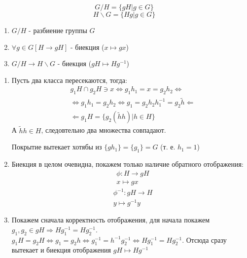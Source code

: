 \begin{Def}
\[
	G / H = \{gH | g \in G\}
\]
\[
	H \backslash G = \{Hg | g \in G\}
\]
\end{Def}

\begin{Th}
\begin{enumerate}
\item $G / H$ - разбиение группы $G$

\item $\forall g \in G \left[H \rightarrow gH\right]$ - биекция ($x \mapsto gx$)

\item $G / H \rightarrow H \backslash G$ - биекция ($gH \mapsto Hg^{-1}$)
\end{enumerate}
\end{Th}

\begin{Proof}
\begin{enumerate}
\item Пусть два класса пересекаются, тогда:
\[
\begin{split}
	& g_1H \cap g_2H \ni x \Leftrightarrow g_1h_1 = x = g_2h_2 \Leftrightarrow \\
	& \Leftrightarrow g_1h_1 = g_2h_2 \Leftrightarrow g_1 = g_2 h_2 h_1^{-1} = g_2 \tilde h \Leftarrow \\
	& \Leftarrow g_1H = \{g_2 \left(\tilde h h\right) | h \in H\} 
\end{split}
\]
А $\tilde h h \in H$, следовтельно два множества совпадают.

Покрытие вытекает хотябы из $\{gh_1\} = \{g_1\} = G$ (т. е. $h_1 = 1$)

\item Биекция в целом очевидна, покажем только наличие обратного отображения:
\[
\begin{split}
	& \phi : H \rightarrow gH \\
	& x \mapsto gx
\end{split}
\]
\[
\begin{split}
	& \phi^{-1} : gH \rightarrow H \\
	& y \mapsto g^{-1}y
\end{split}
\]

\item Покажем сначала корректность отображения, для начала покажем $g_1, g_2 \in gH \Rightarrow Hg_1^{-1} = Hg_2^{-1}$. $g_1H = g_2H \Leftrightarrow g_1 = g_2h \Leftrightarrow g_1^{-1} = h^{-1}g_2^{-1} \Leftrightarrow Hg_1^{-1} = Hg_2^{-1}$. Отсюда сразу вытекает и биекция отображения $gH \mapsto Hg^{-1}$
\end{enumerate}
\end{Proof}

